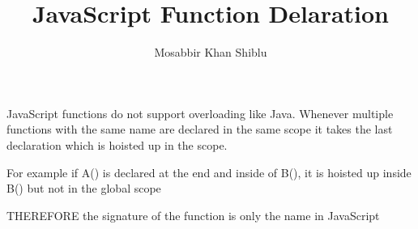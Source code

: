 \documentclass[conference]{IEEEtran}
\title{JavaScript Function Delaration}
\author{Mosabbir Khan Shiblu}
\begin{document}
	JavaScript functions do not support overloading like Java.
	Whenever multiple functions with the same name are declared in the same scope it takes the last declaration which is hoisted up in the scope.
	
	For example if A() is declared at the end and inside of B(), it is hoisted up inside B() but not in the global scope
	
	THEREFORE the signature of the function is only the name in JavaScript
\end{document}
